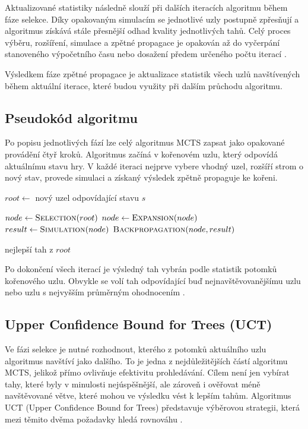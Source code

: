 Aktualizované statistiky následně slouží při dalších iteracích algoritmu během fáze selekce. Díky opakovaným simulacím 
se jednotlivé uzly postupně zpřesňují a algoritmus získává stále přesnější odhad kvality jednotlivých tahů. Celý proces výběru, 
rozšíření, simulace a zpětné propagace je opakován až do vyčerpání stanoveného výpočetního času nebo dosažení předem určeného počtu iterací \cite{browne2012mcts}.

Výsledkem fáze zpětné propagace je aktualizace statistik všech uzlů navštívených během aktuální iterace, které budou využity při dalším průchodu algoritmu.

\subsection{Pseudokód algoritmu}

Po popisu jednotlivých fází lze celý algoritmus MCTS zapsat jako opakované provádění čtyř kroků. 
Algoritmus začíná v kořenovém uzlu, který odpovídá aktuálnímu stavu hry. V každé iteraci nejprve 
vybere vhodný uzel, rozšíří strom o nový stav, provede simulaci a získaný výsledek zpětně propaguje ke kořeni.

\begin{algorithm}[H]
\caption{Algoritmus Monte Carlo Tree Search}
\label{alg:mcts}
\begin{algorithmic}[1]
    \State $root \gets$ nový uzel odpovídající stavu $s$

        \State $node \gets \Call{Selection}{root}$
        \State $node \gets \Call{Expansion}{node}$
        \State $result \gets \Call{Simulation}{node}$
        \State $\Call{Backpropagation}{node, result}$
    \EndFor

    \State \Return nejlepší tah z $root$
\EndFunction
\end{algorithmic}
\end{algorithm}

Po dokončení všech iterací je výsledný tah vybrán podle statistik potomků kořenového uzlu. 
Obvykle se volí tah odpovídající buď nejnavštěvovanějšímu uzlu nebo uzlu s nejvyšším průměrným ohodnocením \cite{browne2012mcts}.

\subsection{Upper Confidence Bound for Trees (UCT)}

Ve fázi selekce je nutné rozhodnout, kterého z potomků aktuálního uzlu algoritmus navštíví jako dalšího. To je 
jedna z nejdůležitějších částí algoritmu MCTS, jelikož přímo ovlivňuje efektivitu prohledávání. Cílem není jen vybírat
tahy, které byly v minulosti nejúspěšnější, ale zároveň i ověřovat méně navštěvované větve, které mohou ve výsledku vést k lepším tahům. 
Algoritmus UCT (Upper Confidence Bound for Trees) představuje výběrovou strategii, která mezi těmito dvěma požadavky hledá rovnováhu \cite{kocsis2006uct,browne2012mcts}.

